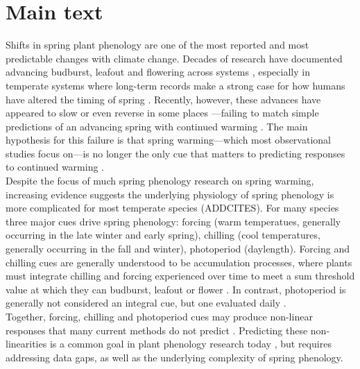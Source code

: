 \documentclass[11pt,letter]{article}
\begin{document}
\section{Main text}
Shifts in spring plant phenology are one of the most reported and most predictable changes with climate change. Decades of research have documented advancing budburst, leafout and flowering across systems \citep{delpierre2009, yu2010,Ellwood2012,jochner2013,hereford2017}, especially in temperate systems where long-term records make a strong case for how humans have altered the timing of spring \citep{Schwartz:1997nn,Menzel2003a,Menzel:2006}. Recently, however, these advances have appeared to slow \citep{fu2015} or even reverse in some places \citep{yu2010}---failing to match simple predictions of an advancing spring with continued warming \citep{Ellwood2012}. The main hypothesis for this failure is that spring warming---which most observational studies focus on---is no longer the only cue that matters to predicting responses to continued warming \citep{chuine2016,gauzere2019}.\\

Despite the focus of much spring phenology research on spring warming, increasing evidence suggests the underlying physiology of spring phenology is more complicated for most temperate species (ADDCITES). For many species three major cues drive spring phenology: forcing (warm temperatues, generally occurring in the late winter and early spring), chilling (cool temperatures, generally occurring in the fall and winter), photoperiod (daylength). Forcing and chilling cues are generally understood to be accumulation processes, where plants must integrate chilling and forcing experienced over time to meet a sum threshold value at which they can budburst, leafout or flower \citep{Chuine2000}. In contrast, photoperiod is generally not considered an integral cue, but one evaluated daily \citep{Singh:2017}. \\

Together, forcing, chilling and photoperiod cues may produce non-linear responses that many current methods do not predict \citep[e.g.,][]{Ellwood2012}. Predicting these non-linearities is a common goal in plant phenology research today \citep{gusewell2017, martlusch2017,gauzere2019,chen2019,keenan2019}, but requires addressing data gaps, as well as the underlying complexity of spring phenology. \\
\end{document}

